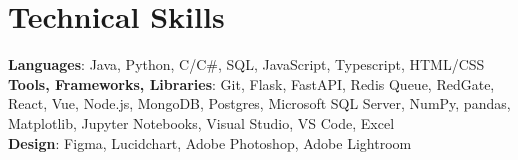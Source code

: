 \documentclass[letterpaper,11pt]{article}
\begin{document}
%
\section{Technical Skills}
 \begin{itemize}[leftmargin=0.15in, label={}]
    \small{\item{
     \textbf{Languages}{: Java, Python, C/C\#, SQL, JavaScript, Typescript, HTML/CSS} \\
     \textbf{Tools, Frameworks, Libraries}{: Git, Flask, FastAPI, Redis Queue, RedGate, React, Vue, Node.js, MongoDB, Postgres, Microsoft SQL Server, NumPy, pandas, Matplotlib, Jupyter Notebooks, Visual Studio, VS Code, Excel} \\
     \textbf{Design}{: Figma, Lucidchart, Adobe Photoshop, Adobe Lightroom}
    }}
 \end{itemize}


\end{document}
